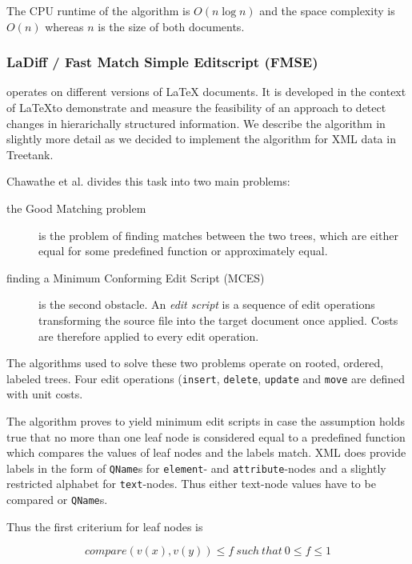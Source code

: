The CPU runtime of the algorithm is $O(n \log n)$ and the space complexity is $O(n)$ whereas $n$ is the size of both documents.

\subsubsection{LaDiff / Fast Match Simple Editscript (FMSE)\cite{chawathe1996change}}\label{subsec::ladiff}
operates on different versions of LaTeX documents. It is developed in the context of \LaTeX to demonstrate and measure the feasibility of an approach to detect changes in hierarichally structured information. We describe the algorithm in slightly more detail as we decided to implement the algorithm for XML data in Treetank.

Chawathe et al. divides this task into two main problems:

\begin{description}
\item[the Good Matching problem] is the problem of finding matches between the two trees, which are either equal for some predefined function or approximately equal.
\item[finding a Minimum Conforming Edit Script (MCES)] is the second obstacle. An \emph{edit script} is a sequence of edit operations transforming the source file into the target document once applied. Costs are therefore applied to every edit operation.
\end{description}

The algorithms used to solve these two problems operate on rooted, ordered, labeled trees. Four edit operations (\texttt{insert}, \texttt{delete}, \texttt{update} and \texttt{move} are defined with unit costs.

The algorithm proves to yield minimum edit scripts in case the assumption holds true that no more than one leaf node is considered equal to a predefined function which compares the values of leaf nodes and the labels match. XML does provide labels in the form of \texttt{QName}s for \texttt{element}- and \texttt{attribute}-nodes and a slightly restricted alphabet for \texttt{text}-nodes. Thus either text-node values have to be compared or \texttt{QName}s.

Thus the first criterium for leaf nodes is 

\begin{equation} 
compare(v(x), v(y)) \leq f\ such\ that\ 0 \leq f \leq 1
\end{equation}

